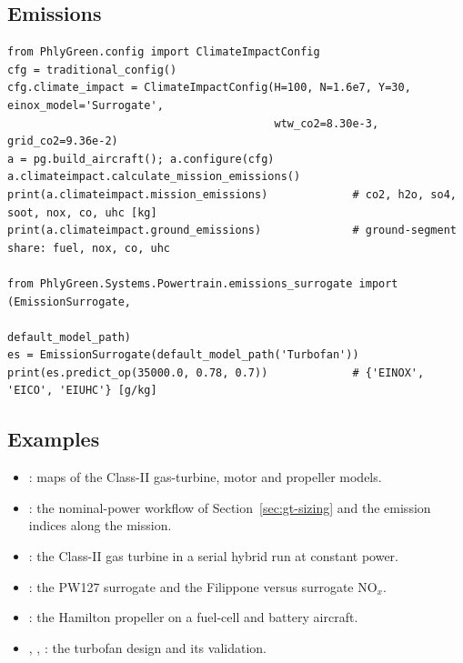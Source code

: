 \documentclass[a4paper,11pt]{article}
\begin{document}
\subsection{Emissions}
\begin{lstlisting}
from PhlyGreen.config import ClimateImpactConfig
cfg = traditional_config()
cfg.climate_impact = ClimateImpactConfig(H=100, N=1.6e7, Y=30, einox_model='Surrogate',
                                         wtw_co2=8.30e-3, grid_co2=9.36e-2)
a = pg.build_aircraft(); a.configure(cfg)
a.climateimpact.calculate_mission_emissions()
print(a.climateimpact.mission_emissions)             # co2, h2o, so4, soot, nox, co, uhc [kg]
print(a.climateimpact.ground_emissions)              # ground-segment share: fuel, nox, co, uhc

from PhlyGreen.Systems.Powertrain.emissions_surrogate import (EmissionSurrogate,
                                                              default_model_path)
es = EmissionSurrogate(default_model_path('Turbofan'))
print(es.predict_op(35000.0, 0.78, 0.7))             # {'EINOX', 'EICO', 'EIUHC'} [g/kg]
\end{lstlisting}

\subsection{Examples}
\begin{itemize}
\item {}: maps of the Class-II
  gas-turbine, motor and propeller models.
\item {}: the nominal-power workflow of
  Section~\ref{sec:gt-sizing} and the emission indices along the mission.
\item {}: the Class-II gas turbine in a serial
  hybrid run at constant power.
\item {}: the PW127 surrogate and the Filippone versus
  surrogate NO$_x$.
\item {}: the Hamilton propeller on a
  fuel-cell and battery aircraft.
\item {}, ,
  : the turbofan design and its validation.
\end{itemize}
\end{document}
